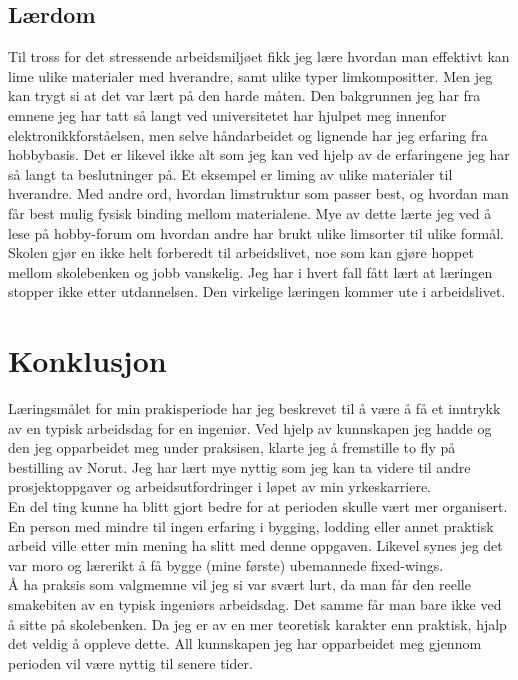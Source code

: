 \documentclass[12pt, a4paper]{article}
\begin{document}
\subsection{Lærdom}
Til tross for det stressende arbeidsmiljøet fikk jeg lære hvordan man effektivt kan lime ulike materialer med hverandre, samt ulike typer limkompositter. Men jeg kan trygt si at det var lært på den harde måten. Den bakgrunnen jeg har fra emnene jeg har tatt så langt ved universitetet har hjulpet meg innenfor elektronikkforståelsen, men selve håndarbeidet og lignende har jeg erfaring fra hobbybasis. Det er likevel ikke alt som jeg kan ved hjelp av de erfaringene jeg har så langt ta beslutninger på. Et eksempel er liming av ulike materialer til hverandre. Med andre ord, hvordan limstruktur som passer best, og hvordan man får best mulig fysisk binding mellom materialene. Mye av dette lærte jeg ved å lese på hobby-forum om hvordan andre har brukt ulike limsorter til ulike formål. \\
Skolen gjør en ikke helt forberedt til arbeidslivet, noe som kan gjøre hoppet mellom skolebenken og jobb vanskelig. Jeg har i hvert fall fått lært at læringen stopper ikke etter utdannelsen. Den virkelige læringen kommer ute i arbeidslivet. 

\section{Konklusjon}
Læringsmålet for min prakisperiode har jeg beskrevet til å være å få et inntrykk av en typisk arbeidsdag for en ingeniør. Ved hjelp av kunnskapen jeg hadde og den jeg opparbeidet meg under praksisen, klarte jeg å fremstille to fly på bestilling av Norut. Jeg har lært mye nyttig som jeg kan ta videre til andre prosjektoppgaver og arbeidsutfordringer i løpet av min yrkeskarriere. \\
En del ting kunne ha blitt gjort bedre for at perioden skulle vært mer organisert. En person med mindre til ingen erfaring i bygging, lodding eller annet praktisk arbeid ville etter min mening ha slitt med denne oppgaven. Likevel synes jeg det var moro og lærerikt å få bygge (mine første) ubemannede fixed-wings. \\
Å ha praksis som valgmemne vil jeg si var svært lurt, da man får den reelle smakebiten av en typisk ingeniørs arbeidsdag. Det samme får man bare ikke ved å sitte på skolebenken. Da jeg er av en mer teoretisk karakter enn praktisk, hjalp det veldig å oppleve dette. All kunnskapen jeg har opparbeidet meg gjennom perioden vil være nyttig til senere tider. 
\clearpage
\end{document}
